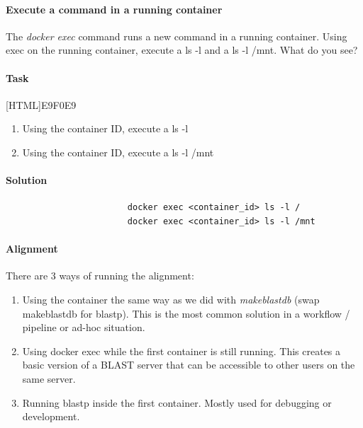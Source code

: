 \documentclass[12pt]{article}
\begin{document}
			\paragraph{Execute a command in a running container}
				The \textit{docker exec }command runs a new command in a running container.
			Using exec on the running container, execute a ls -l and a ls -l /mnt.
			What do you see?
	
			\paragraph{Task}
				[HTML]{E9F0E9}{\parbox{\linewidth}{%
						\begin{enumerate}
							\item Using the container ID, execute a ls -l
							\item Using the container ID, execute a ls -l /mnt
						\end{enumerate}
				}}

			\paragraph{Solution}	
	
				\begin{minipage}{\linewidth}
					\begin{lstlisting}
						docker exec <container_id> ls -l /
						docker exec <container_id> ls -l /mnt
					\end{lstlisting}
				\end{minipage}
			
			\paragraph{Alignment}
			
			There are 3 ways of running the alignment:
			\begin{enumerate}
				\item Using the container the same way as we did with \textit{makeblastdb} (swap makeblastdb for blastp). This is the most common solution in a workflow / pipeline or ad-hoc situation.
				\item Using docker exec while the first container is still running. This creates a basic version of a BLAST server that can be accessible to other users on the same server.
				\item Running blastp inside the first container. Mostly used for debugging or development.
			\end{enumerate}
			
\end{document}

